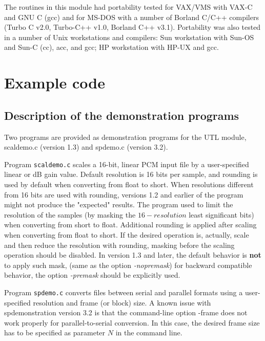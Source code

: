 The routines in this module had portability tested for VAX/VMS with
VAX-C and GNU C (gcc) and for MS-DOS with a number of Borland C/C++
compilers (Turbo C v2.0, Turbo-C++ v1.0, Borland C++ v3.1).
Portability was also tested in a number of Unix workstations and
compilers: Sun workstation with Sun-OS and Sun-C (cc), acc, and gcc;
HP workstation with HP-UX and gcc.


\section{Example code}

\subsection {Description of the demonstration programs}

Two programs are provided as demonstration programs for the UTL module,
scaldemo.c (version 1.3) and spdemo.c (version 3.2).

Program {\tt scaldemo.c} scales a 16-bit, linear PCM input file by a
user-specified linear or dB gain value. Default resolution is 16 bits
per sample, and rounding is used by default when converting from float
to short. When resolutions different from 16 bits are used with
rounding, versions 1.2 and earlier of the program might not produce
the "expected" results. The program used to limit the resolution of
the samples (by masking the $16-resolution$ least significant bits)
when converting from short to float. Additional rounding is applied
after scaling when converting from float to short. If the desired
operation is, actually, scale and then reduce the resolution with
rounding, masking before the scaling operation should be disabled. In
version 1.3 and later, the default behavior is {\bf not} to apply such
mask, (same as the option {\em -nopremask}) for backward compatible
behavior, the option {\em -premask} should be explicitly used.

Program {\tt spdemo.c} converts files between serial and parallel
formats using a user-specified resolution and frame (or block) size. A
known issue with spdemonstration version 3.2 is that the command-line option
-frame does not work properly for parallel-to-serial conversion. In
this case, the desired frame size has to be specified as parameter $N$
in the command line.

